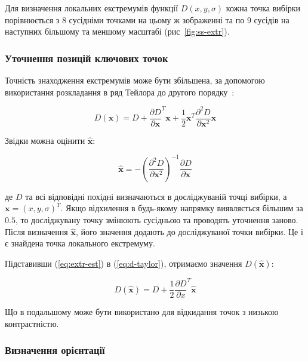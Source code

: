 
Для визначення локальних екстремумів функції $D(x,y,\sigma)$ кожна точка вибірки порівнюється з 8 сусідніми точками на цьому ж зображенні та по 9 сусідів на наступних більшому та меншому масштабі (рис~\ref{fig:ss-extr}).

\subsubsection{Уточнення позицій ключових точок}

Точність знаходження екстремумів може бути збільшена, за допомогою використання розкладання в ряд Тейлора до другого порядку~\cite{Brown02invariantfeatures}:

\begin{equation}
  \label{eq:d-taylor}
  D(\mathbf{x}) = D + {\frac{\partial D}{\partial \mathbf{x}}}^T \mathbf{x} + \frac12 \mathbf{x}^T \frac{\partial ^2 D}{\partial\mathbf{x}^2}\mathbf{x}
\end{equation}

Звідки можна оцінити $\hat{\mathbf{x}}$:

\begin{equation}
  \label{eq:extr-est}
  \hat{\mathbf{x}} = -\left(\frac{\partial^2 D}{\partial \mathbf{x}^2}\right)^{-1} \frac{\partial D}{\partial \mathbf{x}}
\end{equation}

де $D$ та всі відповідні похідні визначаються в досліджуваній точці вибірки, а $\mathbf{x} = (x,y,\sigma)^T$. Якщо відхилення в будь-якому напрямку виявляється більшим за $0.5$, то досліджувану точку змінюють сусідньою та проводять уточнення заново. Після визначення $\hat{\mathbf{x}}$, його значення додають до досліджуваної точки вибірки. Це і є знайдена точка локального екстремуму. 

Підставивши (\ref{eq:extr-est}) в (\ref{eq:d-taylor}), отримаємо значення $D(\hat{\mathbf{x}})$:

\begin{equation*}
  D(\hat{\mathbf{x}}) = D + \frac12 {\frac{\partial D}{\partial x}}^T \hat{\mathbf{x}}
\end{equation*}

Що в подальшому може бути використано для відкидання точок з низькою контрастністю.

\subsubsection{Визначення орієнтації}

